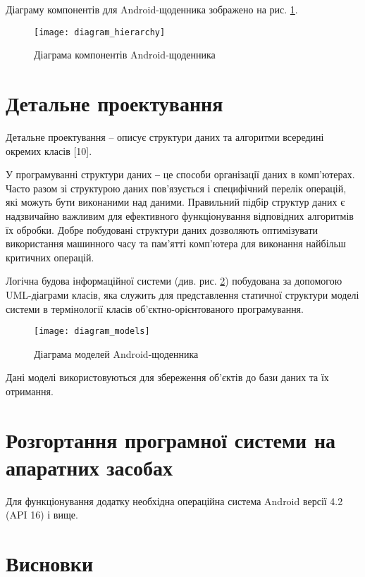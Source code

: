 \documentclass[../main.tex]{subfiles}
\begin{document}
Діаграму компонентів для Android-щоденника зображено на рис. \ref{diagram:hierarchy}.


\begin{figure}[H]
	\centering
	\texttt{[image: diagram\_hierarchy]}
	\caption{Діаграма компонентів Android-щоденника}
	\label{diagram:hierarchy}
\end{figure}

\section{Детальне проектування}

Детальне проектування – описує структури даних та алгоритми всередині окремих класів [10]. 

У програмуванні структури даних ‒ це способи організації даних в комп’ютерах. Часто разом зі структурою даних пов’язується і специфічний перелік операцій, які можуть бути виконаними над даними.
Правильний підбір структур даних є надзвичайно важливим для ефективного функціонування відповідних алгоритмів їх обробки. Добре побудовані структури даних дозволяють оптимізувати використання машинного часу та пам’ятті комп’ютера для виконання найбільш критичних операцій.

Логічна будова інформаційної системи (див. рис. \ref{diagram:models}) побудована  за допомогою UML-діаграми класів, яка служить для представлення статичної структури моделі системи в термінології класів об’єктно-орієнтованого програмування.

\begin{figure}[H]
	\centering
	\texttt{[image: diagram\_models]}
	\caption{Діаграма моделей Android-щоденника}
	\label{diagram:models}
\end{figure}

Дані моделі використовуються для збереження об'єктів до бази даних та їх отримання.


\section{Розгортання програмної системи на апаратних засобах}

Для функціонування додатку необхідна операційна система Android версії 4.2 (API 16) і вище.


\section{Висновки}

\end{document}

